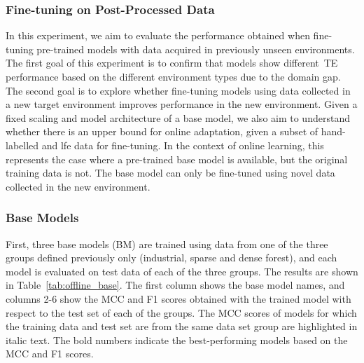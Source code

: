 \subsubsection{Fine-tuning on Post-Processed Data}
\label{ch7:finetuning_post_data}
In this experiment, we aim to evaluate the performance obtained when fine-tuning pre-trained models with data acquired in previously unseen environments. The first goal of this experiment is to confirm that models show different~\ac{TE} performance based on the different environment types due to the domain gap. The second goal is to explore whether fine-tuning models using data collected in a new target environment improves performance in the new environment. Given a fixed scaling and model architecture of a base model, we also aim to understand whether there is an upper bound for online adaptation, given a subset of hand-labelled and \ac{lfe} data for fine-tuning. In the context of online learning, this represents the case where a pre-trained base model is available, but the original training data is not. The base model can only be fine-tuned using novel data collected in the new environment.

\subsubsection{Base Models}
First, three base models (BM) are trained using data from one of the three groups defined previously only (industrial, sparse and dense forest), and each model is evaluated on test data of each of the three groups. The results are shown in Table~\ref{tab:offline_base}. The first column shows the base model names, and columns 2-6 show the MCC and F1 scores obtained with the trained model with respect to the test set of each of the groups. The MCC scores of models for which the training data and test set are from the same data set group are highlighted in italic text. The bold numbers indicate the best-performing models based on the MCC and F1 scores. 



